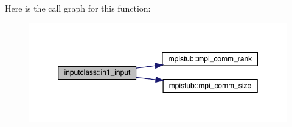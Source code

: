 Here is the call graph for this function\+:\nopagebreak
\begin{figure}[H]
\begin{center}
\leavevmode
\includegraphics[width=350pt]{namespaceinputclass_a907319f6e5d34930fbc63f5af426e9bd_cgraph}
\end{center}
\end{figure}
\mbox{\label{namespaceinputclass_af94bb0662dc4e95990a7b13c1110d831}} 
